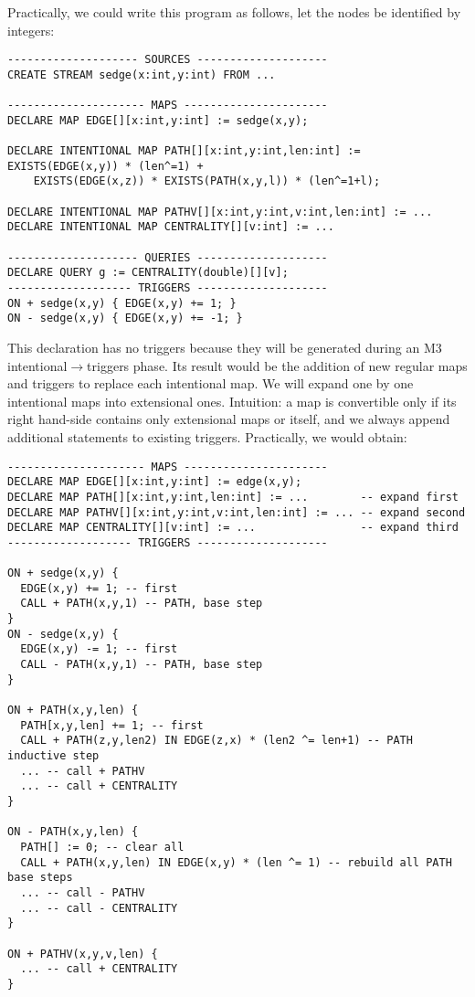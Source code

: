 \documentclass[10pt]{article}
\begin{document}
Practically, we could write this program as follows, let the nodes be identified by integers:
\begin{verbatim}
-------------------- SOURCES --------------------
CREATE STREAM sedge(x:int,y:int) FROM ...

--------------------- MAPS ----------------------
DECLARE MAP EDGE[][x:int,y:int] := sedge(x,y);

DECLARE INTENTIONAL MAP PATH[][x:int,y:int,len:int] := EXISTS(EDGE(x,y)) * (len^=1) +
    EXISTS(EDGE(x,z)) * EXISTS(PATH(x,y,l)) * (len^=1+l);

DECLARE INTENTIONAL MAP PATHV[][x:int,y:int,v:int,len:int] := ...
DECLARE INTENTIONAL MAP CENTRALITY[][v:int] := ...

-------------------- QUERIES --------------------
DECLARE QUERY g := CENTRALITY(double)[][v];
------------------- TRIGGERS --------------------
ON + sedge(x,y) { EDGE(x,y) += 1; }
ON - sedge(x,y) { EDGE(x,y) += -1; }
\end{verbatim}
This declaration has no triggers because they will be generated during an M3 intentional$\to$triggers phase. Its result would be the addition of new regular maps and triggers to replace each intentional map.
\newpage
We will expand one by one intentional maps into extensional ones. Intuition: a map is convertible only if its right hand-side contains only extensional maps or itself, and we always append additional statements to existing triggers. Practically, we would obtain:
\begin{verbatim}
--------------------- MAPS ----------------------
DECLARE MAP EDGE[][x:int,y:int] := edge(x,y);
DECLARE MAP PATH[][x:int,y:int,len:int] := ...        -- expand first
DECLARE MAP PATHV[][x:int,y:int,v:int,len:int] := ... -- expand second
DECLARE MAP CENTRALITY[][v:int] := ...                -- expand third
------------------- TRIGGERS --------------------

ON + sedge(x,y) {
  EDGE(x,y) += 1; -- first
  CALL + PATH(x,y,1) -- PATH, base step
}
ON - sedge(x,y) {
  EDGE(x,y) -= 1; -- first
  CALL - PATH(x,y,1) -- PATH, base step
}

ON + PATH(x,y,len) {
  PATH[x,y,len] += 1; -- first
  CALL + PATH(z,y,len2) IN EDGE(z,x) * (len2 ^= len+1) -- PATH inductive step
  ... -- call + PATHV
  ... -- call + CENTRALITY
}

ON - PATH(x,y,len) {
  PATH[] := 0; -- clear all
  CALL + PATH(x,y,len) IN EDGE(x,y) * (len ^= 1) -- rebuild all PATH base steps
  ... -- call - PATHV
  ... -- call - CENTRALITY
}

ON + PATHV(x,y,v,len) {
  ... -- call + CENTRALITY
}
\end{verbatim}
\end{document}
